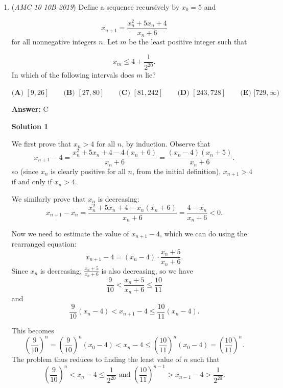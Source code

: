 \begin{enumerate}
\textbf{Solution 5 (tangent cheese)}

After getting $x=5$, let $C=(5,0)$. Get the slopes of the lines $AC$ and $BC$, namely $\frac{13}{6-5}=13$, $\frac{11}{12-5}=\frac{11}{7}$. Then, use tangent angle subtraction to get $\tan{2x}=\frac{13-\frac{11}{7}}{1+13*\frac{11}{7}}=\frac{80}{150}=\frac{8}{15}$. Then, apply tangent double angle to get $\tan{2x}=\frac{8}{15}=\frac{2\tan{x}}{1-\tan^2{x}}$. Solving, we obtain $\tan{x}=\frac{1}{4}$. Then, note that $\tan{x}=r/{BC}$, so $r=\frac{1}{4}*\sqrt{170}$. Finishing off, we obtain $A=\pi*r^2=\pi*170/16=\boxed{\textbf{(C) }\frac{85}{8}\pi}$. 

 


	\item (\textit{AMC 10 10B 2019}) Define a sequence recursively by $x_0=5$ and

 \[x_{n+1}=\frac{x_n^2+5x_n+4}{x_n+6}\]for all nonnegative integers $n.$ Let $m$ be the least positive integer such that

 \[x_m\leq 4+\frac{1}{2^{20}}.\]In which of the following intervals does $m$ lie?


 $\textbf{(A) } [9,26] \qquad\textbf{(B) } [27,80] \qquad\textbf{(C) } [81,242]\qquad\textbf{(D) } [243,728] \qquad\textbf{(E) } [729,\infty)$

 \textbf{Answer: }C



\textbf{Solution 1}

We first prove that $x_n > 4$ for all $n$, by induction. Observe that
 \[x_{n+1} - 4 = \frac{x_n^2 + 5x_n + 4 - 4(x_n+6)}{x_n+6} = \frac{(x_n - 4)(x_n+5)}{x_n+6}.\]so (since $x_n$ is clearly positive for all $n$, from the initial definition), $x_{n+1} > 4$ if and only if $x_{n} > 4$.

 We similarly prove that $x_n$ is decreasing:
 \[x_{n+1} - x_n = \frac{x_n^2 + 5x_n + 4 - x_n(x_n+6)}{x_n+6} = \frac{4-x_n}{x_n+6} < 0.\]

 Now we need to estimate the value of $x_{n+1}-4$, which we can do using the rearranged equation:
 \[x_{n+1} - 4 = (x_n-4)\cdot\frac{x_n + 5}{x_n+6}.\]Since $x_n$ is decreasing, $\frac{x_n + 5}{x_n+6}$ is also decreasing, so we have
 \[\frac{9}{10} < \frac{x_n + 5}{x_n+6} \le \frac{10}{11}\]and
 \[\frac{9}{10}(x_n-4) < x_{n+1} - 4 \le \frac{10}{11}(x_n-4).\]

 This becomes
 \[\left(\frac{9}{10}\right)^n = \left(\frac{9}{10}\right)^n \left(x_0-4\right) < x_{n} - 4 \le \left(\frac{10}{11}\right)^n \left(x_0-4\right) = \left(\frac{10}{11}\right)^n.\]The problem thus reduces to finding the least value of $n$ such that
 \[\left(\frac{9}{10}\right)^n < x_{n} - 4 \le \frac{1}{2^{20}} \text{  and  }  \left(\frac{10}{11}\right)^{n-1} > x_{n-1} - 4 > \frac{1}{2^{20}}.\]


\end{enumerate}
